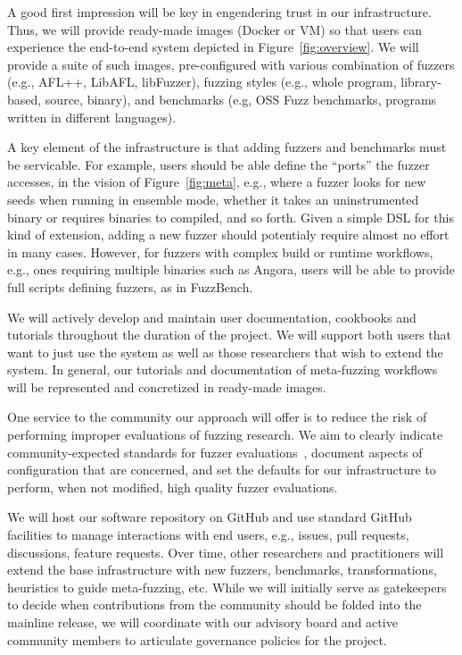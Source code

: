 

A good first impression will be key in engendering trust in our infrastructure.
Thus, we will provide ready-made images (Docker or VM) so that users can experience
the end-to-end system depicted in Figure~\ref{fig:overview}.
We will provide a suite of such images, pre-configured with various combination of
fuzzers (e.g., AFL++, LibAFL, libFuzzer), 
fuzzing styles (e.g., whole program, library-based, source, binary), 
and benchmarks (e.g, OSS Fuzz benchmarks, programs written in
different languages).

A key element of the infrastructure is that adding fuzzers and
benchmarks must be servicable. For example, users should be able define the
``ports'' the fuzzer accesses, in the vision of Figure~\ref{fig:meta},
e.g., where a fuzzer looks for new seeds when running in ensemble
mode, whether it takes an uninstrumented binary or requires binaries
to compiled, and so forth.  Given a simple DSL for this kind of
extension, adding a new fuzzer should potentialy require almost no
effort in many cases.  However, for fuzzers with complex build or
runtime workflows, e.g., ones requiring multiple binaries such as
Angora, users will be able to provide full scripts defining fuzzers,
as in FuzzBench.

We will actively develop and maintain user documentation, cookbooks and tutorials throughout
the duration of the project. We will support both users that want to just use the system
as well as those researchers that wish to extend the system.
In general, our tutorials and documentation of meta-fuzzing workflows will be
represented and concretized in ready-made images.

One service to the community our approach will offer is to reduce the
risk of performing improper evaluations of fuzzing research.  We aim
to clearly indicate community-expected standards for fuzzer
evaluations~\cite{FuzzerHicks}, document aspects of configuration that
are concerned, and set the defaults for our infrastructure to perform,
when not modified, high quality fuzzer evaluations.

We will host our software repository on GitHub and use standard GitHub facilities
to manage interactions with end users, e.g., issues, pull requests, discussions, feature requests.
Over time, other researchers and practitioners will extend the base infrastructure with
new fuzzers, benchmarks, transformations, heuristics to guide meta-fuzzing, etc. 
While we will initially serve as gatekeepers to decide when contributions from the community
should be folded into the mainline release, we will coordinate with our advisory board and active community 
members to articulate governance policies for the project.

